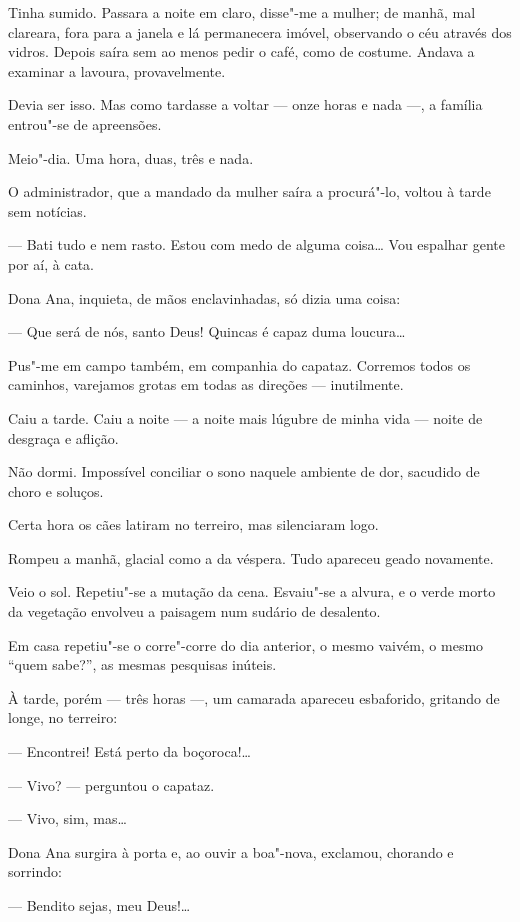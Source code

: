 Tinha sumido. Passara a noite em claro, disse"-me a mulher; de manhã, mal
clareara, fora para a janela e lá permanecera imóvel, observando o céu
através dos vidros. Depois saíra sem ao menos pedir o café, como de
costume. Andava a examinar a lavoura, provavelmente.

Devia ser isso. Mas como tardasse a voltar --- onze horas e nada ---, a
família entrou"-se de apreensões.

Meio"-dia. Uma hora, duas, três e nada.

O administrador, que a mandado da mulher saíra a procurá"-lo, voltou à
tarde sem notícias.

--- Bati tudo e nem rasto. Estou com medo de alguma coisa\ldots{} Vou
espalhar gente por aí, à cata.

Dona Ana, inquieta, de mãos enclavinhadas, só dizia uma coisa:

--- Que será de nós, santo Deus! Quincas é capaz duma loucura\ldots{}

Pus"-me em campo também, em companhia do capataz. Corremos todos os
caminhos, varejamos grotas em todas as direções --- inutilmente.

Caiu a tarde. Caiu a noite --- a noite mais lúgubre de minha vida ---
noite de desgraça e aflição.

Não dormi. Impossível conciliar o sono naquele ambiente de dor, sacudido
de choro e soluços.

Certa hora os cães latiram no terreiro, mas silenciaram logo.

Rompeu a manhã, glacial como a da véspera. Tudo apareceu geado
novamente.

Veio o sol. Repetiu"-se a mutação da cena. Esvaiu"-se a alvura, e o verde
morto da vegetação envolveu a paisagem num sudário de desalento.

Em casa repetiu"-se o corre"-corre do dia anterior, o mesmo vaivém, o
mesmo ``quem sabe?'', as mesmas pesquisas inúteis.

À tarde, porém --- três horas ---, um camarada apareceu esbaforido,
gritando de longe, no terreiro:

--- Encontrei! Está perto da boçoroca!\ldots{}

--- Vivo? --- perguntou o capataz.

--- Vivo, sim, mas\ldots{}

Dona Ana surgira à porta e, ao ouvir a boa"-nova, exclamou, chorando e
sorrindo:

--- Bendito sejas, meu Deus!\ldots{}

